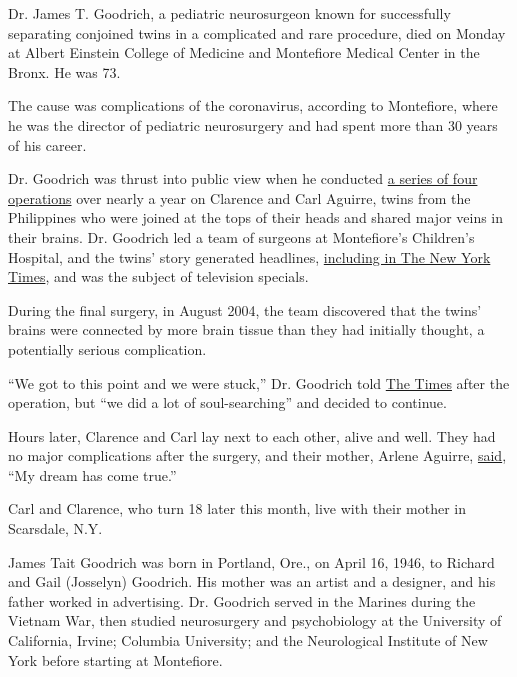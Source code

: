 Dr. James T. Goodrich, a pediatric neurosurgeon known for successfully
separating conjoined twins in a complicated and rare procedure, died on
Monday at Albert Einstein College of Medicine and Montefiore Medical
Center in the Bronx. He was 73.

The cause was complications of the coronavirus, according to Montefiore,
where he was the director of pediatric neurosurgery and had spent more
than 30 years of his career.

Dr. Goodrich was thrust into public view when he conducted
\href{https://www.nytimes.com/2004/08/05/nyregion/surgeons-successfully-separate-conjoined-twins.html}{a
series of four operations} over nearly a year on Clarence and Carl
Aguirre, twins from the Philippines who were joined at the tops of their
heads and shared major veins in their brains. Dr. Goodrich led a team of
surgeons at Montefiore's Children's Hospital, and the twins' story
generated headlines,
\href{https://www.nytimes.com/2003/09/09/nyregion/surgeons-prepare-to-separate-conjoined-twins.html}{including
in The New York Times}, and was the subject of television specials.

During the final surgery, in August 2004, the team discovered that the
twins' brains were connected by more brain tissue than they had
initially thought, a potentially serious complication.

``We got to this point and we were stuck,'' Dr. Goodrich told
\href{https://www.nytimes.com/2004/08/06/nyregion/doctors-separate-twin-boys-despite-finding-brains-were-fused.html}{The
Times} after the operation, but ``we did a lot of soul-searching'' and
decided to continue.

Hours later, Clarence and Carl lay next to each other, alive and well.
They had no major complications after the surgery, and their mother,
Arlene Aguirre,
\href{https://www.nytimes.com/2004/08/10/nyregion/no-major-complications-for-separated-twins-doctors-say.html}{said},
``My dream has come true.''

Carl and Clarence, who turn 18 later this month, live with their mother
in Scarsdale, N.Y.

James Tait Goodrich was born in Portland, Ore., on April 16, 1946, to
Richard and Gail (Josselyn) Goodrich. His mother was an artist and a
designer, and his father worked in advertising. Dr. Goodrich served in
the Marines during the Vietnam War, then studied neurosurgery and
psychobiology at the University of California, Irvine; Columbia
University; and the Neurological Institute of New York before starting
at Montefiore.

